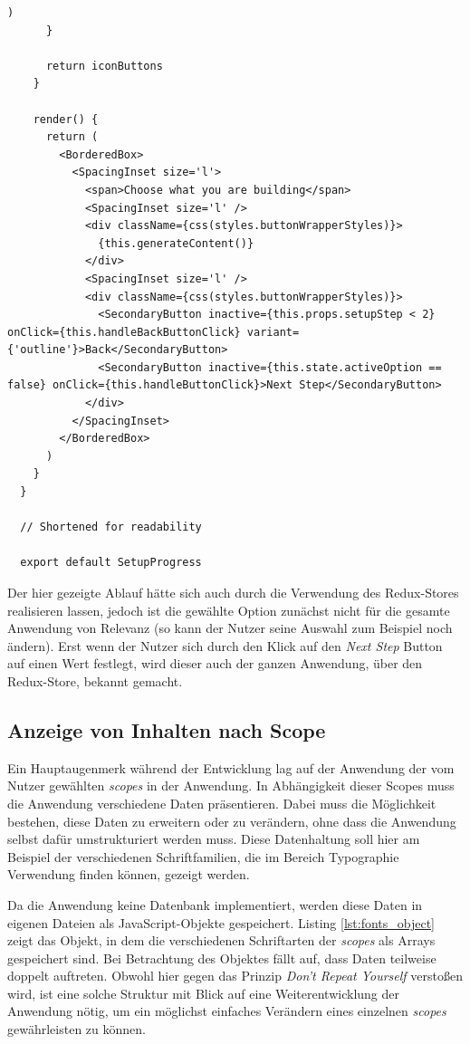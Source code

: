 \begin{lstlisting}[caption=Die Komponente \texttt{SetupProgress} in gekürzter Form, label=lst:setup]
        )
      }

      return iconButtons
    }

    render() {
      return (
        <BorderedBox>
          <SpacingInset size='l'>
            <span>Choose what you are building</span>
            <SpacingInset size='l' />
            <div className={css(styles.buttonWrapperStyles)}>
              {this.generateContent()}
            </div>
            <SpacingInset size='l' />
            <div className={css(styles.buttonWrapperStyles)}>
              <SecondaryButton inactive={this.props.setupStep < 2} onClick={this.handleBackButtonClick} variant={'outline'}>Back</SecondaryButton>
              <SecondaryButton inactive={this.state.activeOption == false} onClick={this.handleButtonClick}>Next Step</SecondaryButton>
            </div>
          </SpacingInset>
        </BorderedBox>
      )
    }
  }

  // Shortened for readability

  export default SetupProgress
\end{lstlisting}

Der hier gezeigte Ablauf hätte sich auch durch die Verwendung des Redux-Stores realisieren lassen, jedoch ist die gewählte Option zunächst nicht für die gesamte Anwendung von Relevanz (so kann der Nutzer seine Auswahl zum Beispiel noch ändern). Erst wenn der Nutzer sich durch den Klick auf den \textit{Next Step} Button auf einen Wert festlegt, wird dieser auch der ganzen Anwendung, über den Redux-Store, bekannt gemacht.

\subsection{Anzeige von Inhalten nach Scope}
\label{chap:display_scope}
Ein Hauptaugenmerk während der Entwicklung lag auf der Anwendung der vom Nutzer gewählten \textit{scopes} in der Anwendung. In Abhängigkeit dieser Scopes muss die Anwendung verschiedene Daten präsentieren. Dabei muss die Möglichkeit bestehen, diese Daten zu erweitern oder zu verändern, ohne dass die Anwendung selbst dafür umstrukturiert werden muss. Diese Datenhaltung soll hier am Beispiel der verschiedenen Schriftfamilien, die im Bereich Typographie Verwendung finden können, gezeigt werden.

Da die Anwendung keine Datenbank implementiert, werden diese Daten in eigenen Dateien als JavaScript-Objekte gespeichert. Listing \ref{lst:fonts_object} zeigt das Objekt, in dem die verschiedenen Schriftarten der \textit{scopes} als Arrays gespeichert sind. Bei Betrachtung des Objektes fällt auf, dass Daten teilweise doppelt auftreten. Obwohl hier gegen das Prinzip \textit{Don’t Repeat Yourself} verstoßen wird, ist eine solche Struktur mit Blick auf eine Weiterentwicklung der Anwendung nötig, um ein möglichst einfaches Verändern eines einzelnen \textit{scopes} gewährleisten zu können.

